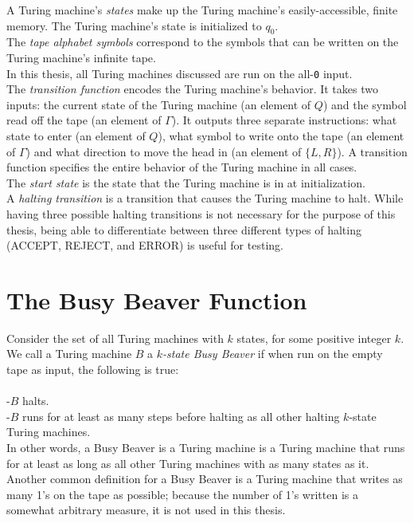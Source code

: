 \documentclass[11pt]{report}
\begin{document}
A Turing machine's \emph{states} make up the Turing machine's easily-accessible, finite memory. The Turing machine's state is initialized to $q_0$. \\

The \emph{tape alphabet symbols} correspond to the symbols that can be written on the Turing machine's infinite tape. \\

In this thesis, all Turing machines discussed are run on the all-\texttt{0} input. \\

The \emph{transition function} encodes the Turing machine's behavior. It takes two inputs: the current state of the Turing machine (an element of $Q$) and the symbol read off the tape (an element of $\Gamma$). It outputs three separate instructions: what state to enter (an element of $Q$), what symbol to write onto the tape (an element of $\Gamma$) and what direction to move the head in (an element of $\{L, R\}$). A transition function specifies the entire behavior of the Turing machine in all cases. \\

The \emph{start state} is the state that the Turing machine is in at initialization. \\

A \emph{halting transition} is a transition that causes the Turing machine to halt. While having three possible halting transitions is not necessary for the purpose of this thesis, being able to differentiate between three different types of halting (ACCEPT, REJECT, and ERROR) is useful for testing.

\section{The Busy Beaver Function}

Consider the set of all Turing machines with $k$ states, for some positive integer $k$. We call a Turing machine $B$ a $k$\emph{-state Busy Beaver} if when run on the empty tape as input, the following is true: \\ \\
-$B$ halts. \\
-$B$ runs for at least as many steps before halting as all other halting $k$-state Turing machines. \cite{busybeaver} \\

In other words, a Busy Beaver is a Turing machine is a Turing machine that runs for at least as long as all other Turing machines with as many states as it. Another common definition for a Busy Beaver is a Turing machine that writes as many 1's on the tape as possible; because the number of 1's written is a somewhat arbitrary measure, it is not used in this thesis. \\
\end{document}
